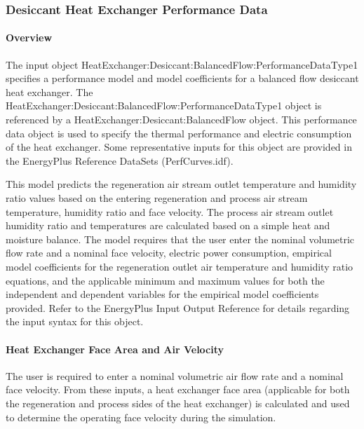 \subsubsection{Desiccant Heat Exchanger Performance Data}\label{desiccant-heat-exchanger-performance-data}

\paragraph{Overview}\label{overview-3-004}

The input object HeatExchanger:Desiccant:BalancedFlow:PerformanceDataType1 specifies a performance model and model coefficients for a balanced flow desiccant heat exchanger. The HeatExchanger:Desiccant:BalancedFlow:PerformanceDataType1 object is referenced by a HeatExchanger:Desiccant:BalancedFlow object. This performance data object is used to specify the thermal performance and electric consumption of the heat exchanger. Some representative inputs for this object are provided in the EnergyPlus Reference DataSets (PerfCurves.idf).

This model predicts the regeneration air stream outlet temperature and humidity ratio values based on the entering regeneration and process air stream temperature, humidity ratio and face velocity. The process air stream outlet humidity ratio and temperatures are calculated based on a simple heat and moisture balance. The model requires that the user enter the nominal volumetric flow rate and a nominal face velocity, electric power consumption, empirical model coefficients for the regeneration outlet air temperature and humidity ratio equations, and the applicable minimum and maximum values for both the independent and dependent variables for the empirical model coefficients provided. Refer to the EnergyPlus Input Output Reference for details regarding the input syntax for this object.

\paragraph{Heat Exchanger Face Area and Air Velocity}\label{heat-exchanger-face-area-and-air-velocity}

The user is required to enter a nominal volumetric air flow rate and a nominal face velocity. From these inputs, a heat exchanger face area (applicable for both the regeneration and process sides of the heat exchanger) is calculated and used to determine the operating face velocity during the simulation.

